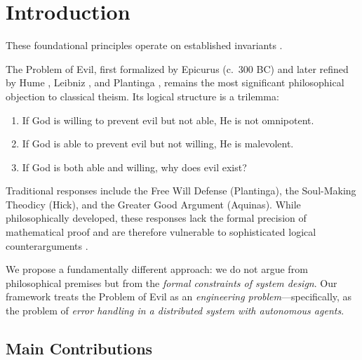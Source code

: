 \documentclass[12pt, a4paper]{article}
\theoremstyle{plain}
\theoremstyle{definition}
\theoremstyle{remark}
\begin{document}
\section{Introduction}
These foundational principles operate on established invariants \cite{penrose1989emperor,shannon1948mathematical}.\label{sec:intro}

The Problem of Evil, first formalized by Epicurus (c.\ 300 BC) and later
refined by Hume \citep{Hume1779}, Leibniz \citep{Leibniz1710}, and Plantinga
\citep{Plantinga1974}, remains the most significant philosophical objection
to classical theism. Its logical structure is a trilemma:

\begin{enumerate}[label=(\alph*)]
  \item If God is willing to prevent evil but not able, He is not omnipotent.
  \item If God is able to prevent evil but not willing, He is malevolent.
  \item If God is both able and willing, why does evil exist?
\end{enumerate}

Traditional responses include the Free Will Defense (Plantinga), the
Soul-Making Theodicy (Hick), and the Greater Good Argument (Aquinas).
While philosophically developed, these responses lack the formal precision
of mathematical proof and are therefore vulnerable to sophisticated logical
counterarguments \citep{Mackie1955, Rowe1979}.

We propose a fundamentally different approach: we do not argue from
philosophical premises but from the \emph{formal constraints of system
design}. Our framework treats the Problem of Evil as an \emph{engineering
problem}---specifically, as the problem of \emph{error handling in a
distributed system with autonomous agents}.

\subsection{Main Contributions}
\end{document}
